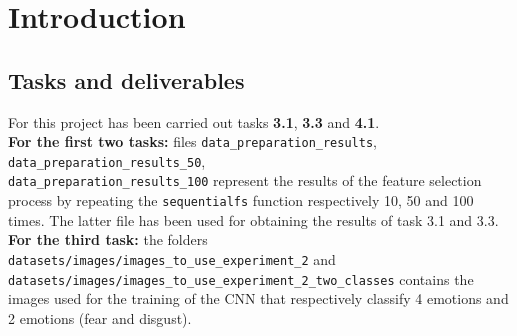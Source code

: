 \section{Introduction}
\subsection{Tasks and deliverables}
For this project has been carried out tasks \textbf{3.1}, \textbf{3.3} and \textbf{4.1}. \\

\textbf{For the first two tasks:} files \verb|data_preparation_results|, \verb|data_preparation_results_50|,\\ \verb|data_preparation_results_100| represent the results of the feature selection process by repeating the \verb|sequentialfs| function respectively 10, 50 and 100 times. The latter file has been used for obtaining the results of task 3.1 and 3.3.\\

\textbf{For the third task:} the folders \verb*|datasets/images/images_to_use_experiment_2|  and \verb*|datasets/images/images_to_use_experiment_2_two_classes| contains the images used for the training of the CNN that respectively classify 4 emotions and 2 emotions (fear and disgust).